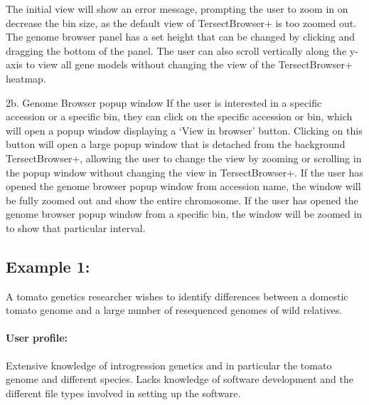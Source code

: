 \documentclass[12pt]{article}
\begin{document}
The initial view will show an error message, prompting the user to zoom in on decrease the bin size, as the default view of TersectBrowser+ is too zoomed out. The genome browser panel has a set height that can be changed by clicking and dragging the bottom of the panel. The user can also scroll vertically along the y-axis to view all gene models without changing the view of the TersectBrowser+ heatmap. 

2b. Genome Browser popup window
If the user is interested in a specific accession or a specific bin, they can click on the specific accession or bin, which will open a popup window displaying a `View in browser' button. Clicking on this button will open a large popup window that is detached from the background TersectBrowser+, allowing the user to change the view by zooming or scrolling in the popup window without changing the view in TersectBrowser+. If the user has opened the genome browser popup window from accession name, the window will be fully zoomed out and show the entire chromosome. If the user has opened the genome browser popup window from a specific bin, the window will be zoomed in to show that particular interval. 


\subsection{Example 1:} A tomato genetics researcher wishes to identify differences between a domestic tomato genome and a large number of resequenced genomes of wild relatives. 

\paragraph{User profile:} Extensive knowledge of introgression genetics and in particular the tomato genome and different species. Lacks knowledge of software development and the different file types involved in setting up the software. 
\end{document}
